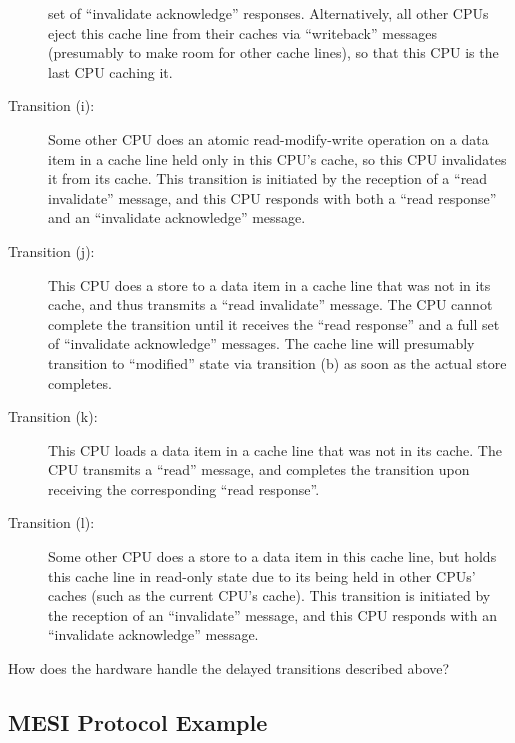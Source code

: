 \begin{description}
	set of ``invalidate acknowledge'' responses.
	Alternatively, all other CPUs eject this cache line from
	their caches via ``writeback'' messages (presumably to make room
	for other cache lines),
	so that this CPU is the last CPU caching it.
\item[Transition (i):]
	Some other CPU does an atomic read-modify-write operation on
	a data item in a cache line held only in this CPU's cache,
	so this CPU invalidates it from its cache.
	This transition is initiated by the reception of a ``read invalidate''
	message, and this CPU responds with both a ``read response''
	and an ``invalidate acknowledge'' message.
\item[Transition (j):]
	This CPU does a store to a data item in a cache line that was not
	in its cache, and thus transmits a ``read invalidate'' message.
	The CPU cannot complete the transition until it receives the
	``read response'' and a full set of ``invalidate acknowledge''
	messages.
	The cache line will presumably transition to ``modified'' state via
	transition (b) as soon as the actual store completes.
\item[Transition (k):]
	This CPU loads a data item in a cache line that was not
	in its cache.
	The CPU transmits a ``read'' message, and completes the
	transition upon receiving the corresponding ``read response''.
\item[Transition (l):]
	Some other CPU does a store to
	a data item in this cache line, but holds this cache line in read-only
	state due to its being held in other CPUs' caches (such as the
	current CPU's cache).
	This transition is initiated by the reception of an ``invalidate''
	message, and this CPU responds with
	an ``invalidate acknowledge'' message.
\end{description}

\QuickQuiz{}
	How does the hardware handle the delayed transitions
	described above?
 \QuickQuizEnd

\subsection{MESI Protocol Example}
\label{sec:app:whymb:MESI Protocol Example}

